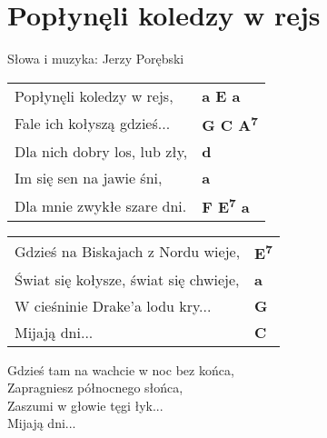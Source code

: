 \section{Popłynęli koledzy w rejs}

Słowa i muzyka: Jerzy Porębski

\vspace{2em}
\begin{tabular}{@{}p{7cm}@{}l@{}}
Popłynęli koledzy w rejs, & \bfseries a E a\\
Fale ich kołyszą gdzieś... & \bfseries G C A\textsuperscript{7}\\
Dla nich dobry los, lub zły, & \bfseries d\\
Im się sen na jawie śni, & \bfseries a\\
Dla mnie zwykłe szare dni. & \bfseries F E\textsuperscript{7} a\\
\end{tabular}

\vspace{1em}
\begin{tabular}{@{}p{7cm}@{}l@{}}
Gdzieś na Biskajach z Nordu wieje, & \bfseries E\textsuperscript{7}\\
Świat się kołysze, świat się chwieje, & \bfseries a\\
W cieśninie Drake'a lodu kry... & \bfseries G\\
Mijają dni... & \bfseries C\\
\end{tabular}

\vspace{1em}
Gdzieś tam na wachcie w noc bez końca, \\
Zapragniesz północnego słońca, \\
Zaszumi w głowie tęgi łyk... \\
Mijają dni... \\

